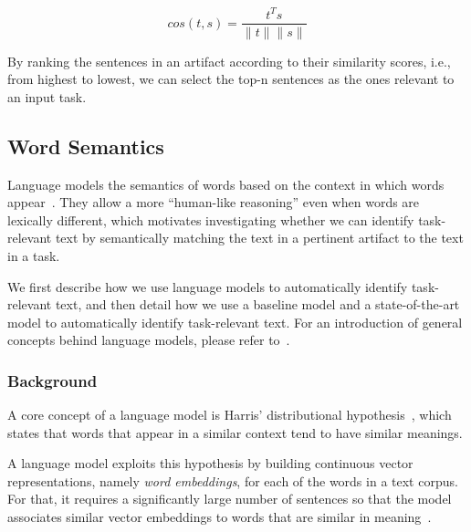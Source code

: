 \begin{equation}
    cos(t,s) = \frac{t^Ts}{\|t\| \|s\|}
    \label{eq:lex-sim}
\end{equation}
\smallskip

By ranking the sentences in an artifact according to their similarity scores, i.e., from highest to lowest,
we can  select the top-n sentences as the ones relevant to an input task.




\subsection{Word Semantics}


Language models  the semantics of words based on the context in which words appear~\cite{harris1954distributional}.
They allow a more ``human-like reasoning'' even when words are lexically different, which 
motivates investigating whether we can identify task-relevant text by semantically matching the text in a pertinent artifact to the text in a task.



We first describe how we use language models to automatically identify task-relevant text, and then
detail how we use a baseline model   and 
a state-of-the-art model to automatically identify task-relevant text.
For an introduction of general concepts behind language models, please refer to~\cite{zhang2021deep-learning}.

\subsubsection{Background}

A core concept of a language model is Harris' distributional hypothesis~\cite{harris1954distributional}, which states that words that appear in a similar context tend to have similar meanings.


A language model exploits this hypothesis by building continuous vector representations, namely \textit{word embeddings}, for each of the words in a text corpus.
For that, it requires a significantly large number of sentences so that
the model associates similar vector embeddings to words that are similar in meaning~\cite{Ye2016}. 


